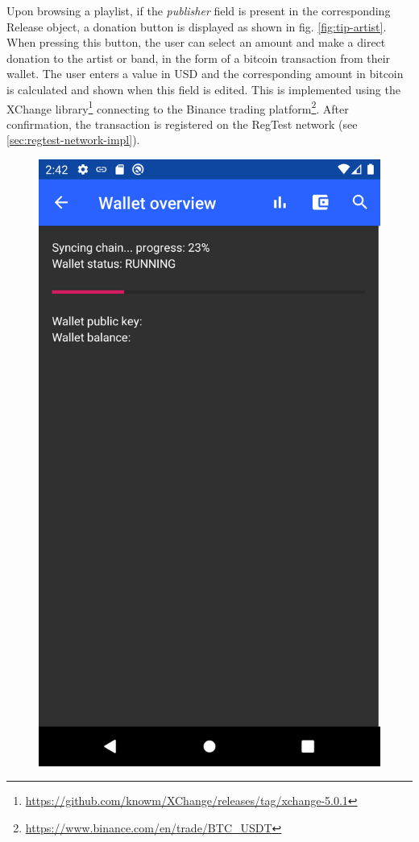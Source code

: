 Upon browsing a playlist, if the \textit{publisher} field is present in the corresponding Release object, a donation button is displayed as shown in fig. \ref{fig:tip-artist}. When pressing this button, the user can select an amount and make a direct donation to the artist or band, in the form of a bitcoin transaction from their wallet. The user enters a value in USD and the corresponding amount in bitcoin is calculated and shown when this field is edited. This is implemented using the XChange library\footnote{\url{https://github.com/knowm/XChange/releases/tag/xchange-5.0.1}} connecting to the Binance trading platform\footnote{\url{https://www.binance.com/en/trade/BTC_USDT}}. After confirmation, the transaction is registered on the RegTest network (see \ref{sec:regtest-network-impl}). 
\begin{figure}
        \includegraphics[width=1\linewidth]{implementation/wallet-sync.png}

\end{figure}
